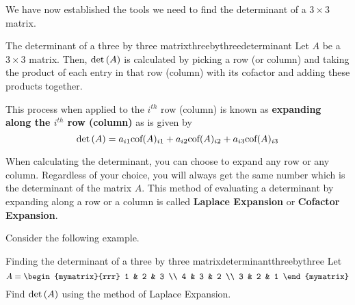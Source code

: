 We have now established the tools we need to find the determinant of a $3 \times3 $ matrix.

\begin{definition}{The determinant of a three by three matrix}{threebythreedeterminant}
Let $A$ be a $3\times 3$ matrix. Then, $\det \left(A\right)$ is calculated by picking a row
(or column) and taking the product of each entry in that row (column) with its
cofactor and adding these products together. 

This process when applied to the $i^{th}$
row (column) is known as \textbf{expanding along the $i^{th}$ row
(column)} as is given by 
\[
\det \left(A\right) = a_{i1}\mbox{cof}(A)_{i1} + a_{i2}\mbox{cof}(A)_{i2} + a_{i3}\mbox{cof}(A)_{i3}
\]

\end{definition}

When calculating the determinant, you can choose to expand any row or any column. Regardless 
of your choice, you will always get the same number which is the determinant of the matrix $A.$ 
This method of evaluating a determinant by expanding along a row or a column is called \textbf{Laplace
Expansion} or \textbf{Cofactor Expansion}.


Consider the following example. 

\begin{example}{Finding the determinant of a three by three matrix}{determinantthreebythree}
Let 
\begin{equation*}
A=\begin{mymatrix}{rrr}
1 & 2 & 3 \\
4 & 3 & 2 \\
3 & 2 & 1
\end{mymatrix} 
\end{equation*}
Find $\det\left(A\right)$ using the method of Laplace Expansion.
\end{example}

